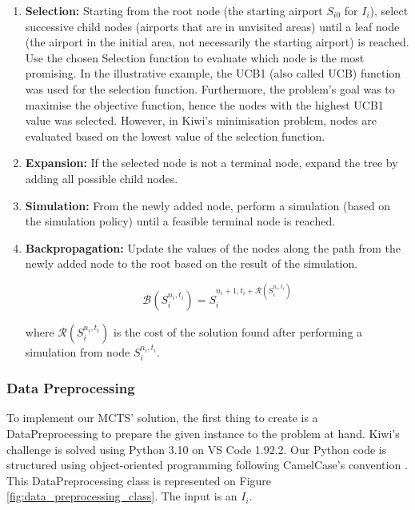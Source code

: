 \documentclass[conference]{IEEEtran}
\begin{document}
\begin{enumerate}
    \item \textbf{Selection:} Starting from the root node (the starting airport $S_{i0}$ for $I_{i}$), select successive child nodes (airports that are in unvisited areas) until a leaf node (the airport in the initial area, not necessarily the starting airport) is reached. Use the chosen Selection function to evaluate which node is the most promising. In the illustrative example, the UCB1 (also called UCB) function was used for the selection function. Furthermore, the problem's goal was to maximise the objective function, hence the nodes with the highest UCB1 value was selected. However, in Kiwi's minimisation problem,  nodes are evaluated based on the lowest value of the selection function.

    \item \textbf{Expansion:} If the selected node is not a terminal node, expand the tree by adding all possible child nodes.

    \item \textbf{Simulation:} From the newly added node, perform a simulation (based on the simulation policy) until a feasible terminal node is reached.

    \item \textbf{Backpropagation:} Update the values of the nodes along the path from the newly added node to the root based on the result of the simulation.

          \begin{equation}
              \mathcal{B}(S^{n_i,t_i}_i) = S^{n_i+1,t_i+\mathcal{R}(S^{n_i,t_i}_i)}_i
          \end{equation}

          where $\mathcal{R}(S^{n_i,t_i}_i)$ is the cost of the solution found after performing a simulation from node $S^{n_i,t_i}_i$.
\end{enumerate}

\subsubsection{Data Preprocessing}

To implement our MCTS' solution, the first thing to create is a DataPreprocessing  to prepare the given instance to the problem at hand. 
Kiwi's challenge is solved using Python 3.10 on VS Code 1.92.2. Our Python code is structured using object-oriented programming following CamelCase's convention \cite{camel_case}. This DataPreprocessing class is represented on Figure \ref{fig:data_preprocessing_class}. The input is an  $I_i$.
\end{document}
